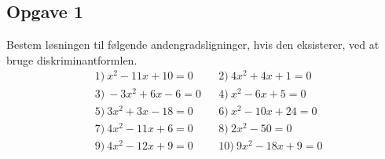 \subsection*{Opgave 1}
Bestem løsningen til følgende andengradsligninger, hvis den eksisterer, ved at bruge diskriminantformlen.
\begin{align*}
	&1) \ x^2 - 11x + 10 = 0 &  &2) \ 4x^2 + 4x + 1 = 0\\
	&3) \ -3x^2 + 6x - 6 = 0 &  &4) \ x^2 - 6x + 5 = 0\\
	&5) \ 3x^2 + 3x - 18 = 0 &  &6) \ x^2 - 10x + 24 = 0\\
	&7) \ 4x^2 - 11x + 6 = 0  &  &8) \ 2x^2 - 50 = 0\\
	&9) \ 4x^2 - 12x + 9 = 0 &  &10) \ 9x^2 - 18x + 9 = 0\\	
 \end{align*}